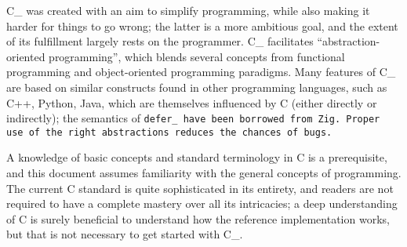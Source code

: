 C\_ was created with an aim to simplify programming,
while also making it harder for things to go wrong;
the latter is a more ambitious goal, and the extent of
its fulfillment largely rests on the programmer.
C\_ facilitates ``abstraction-oriented programming'', which blends several
concepts from functional programming and object-oriented programming paradigms.
Many features of C\_ are based on similar constructs found
in other programming languages, such as C++, Python, Java,
which are themselves influenced by C (either directly or indirectly);
the semantics of \tt{defer_} have been borrowed from Zig.
Proper use of the right abstractions reduces the chances of bugs.

A knowledge of basic concepts and standard terminology in C is a prerequisite,
and this document assumes familiarity with the general concepts of programming.
The current C standard is quite sophisticated in its entirety, and
readers are not required to have a complete mastery over all its intricacies;
a deep understanding of C is surely beneficial to understand how the reference
implementation works, but that is not necessary to get started with C\_.








